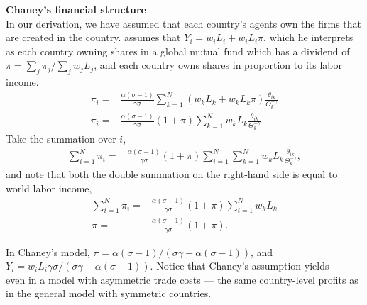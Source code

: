 \documentclass[11pt, pdftex]{article}
\begin{document}
\textbf{Chaney's financial structure}\\
In our derivation, we have assumed that each country's agents own the firms that are created in the country.  \citet{chaney08} assumes that $Y_i=w_iL_i+w_iL_i\pi$, which he interprets as each country owning shares in a global mutual fund which has a dividend of $\pi=\sum_j\pi_j/\sum_jw_jL_j$, and each country owns shares in proportion to its labor income.
\begin{align}
  \pi_i  =& \frac{\alpha(\sigma-1)}{\gamma\sigma}  \sum_{k=1}^N (w_kL_k + w_kL_k\pi)  \frac{\theta_{ik}}{\Theta_k^{-\gamma}}\\
   \pi_i  =& \frac{\alpha(\sigma-1)}{\gamma\sigma}  (1 + \pi)\sum_{k=1}^N w_kL_k  \frac{\theta_{ik}}{\Theta_k^{-\gamma}}
\end{align}
Take the summation over $i$,
\begin{align}
  \sum_{i=1}^N\pi_i  =& \frac{\alpha(\sigma-1)}{\gamma\sigma}  (1 + \pi) \sum_{i=1}^N\sum_{k=1}^N w_kL_k  \frac{\theta_{ik}}{\Theta_k^{-\gamma}},
\end{align}
and note that both the double summation on the right-hand side is equal to world labor income,
\begin{align}
  \sum_{i=1}^N\pi_i  =& \frac{\alpha(\sigma-1)}{\gamma\sigma}  (1 + \pi) \sum_{i=1}^N w_kL_k\\
  \pi  =& \frac{\alpha(\sigma-1)}{\gamma\sigma}  (1 + \pi).
\end{align}

In Chaney's model, $\pi=\alpha(\sigma-1)/(\sigma\gamma-\alpha(\sigma-1))$, and $Y_i=w_iL_i\gamma\sigma/(\sigma\gamma-\alpha(\sigma-1))$. Notice that Chaney's assumption yields --- even in a model with asymmetric trade costs --- the same country-level profits as in the general model with symmetric countries.
\end{document}
